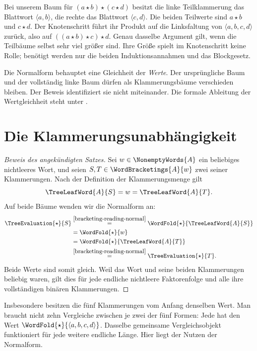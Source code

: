 \BracketingNormalFormDiagram

Bei unserem Baum für \((a\star b)\star(c\star d)\) besitzt die
linke Teilklammerung das Blattwort \(\langle a,b\rangle\), die
rechte das Blattwort \(\langle c,d\rangle\). Die beiden
Teilwerte sind \(a\star b\) und \(c\star d\). Der Knotenschritt
führt ihr Produkt auf die Linksfaltung von
\(\langle a,b,c,d\rangle\) zurück, also auf
\(((a\star b)\star c)\star d\). Genau dasselbe Argument gilt,
wenn die Teilbäume selbst sehr viel größer sind. Ihre Größe spielt
im Knotenschritt keine Rolle; benötigt werden nur die beiden
Induktionsannahmen und das Blockgesetz.

Die Normalform behauptet eine Gleichheit der \emph{Werte}.
Der ursprüngliche Baum und der vollständig linke Baum dürfen als
Klammerungsbäume verschieden bleiben. Der Beweis identifiziert sie
nicht miteinander. Die formale Ableitung der Wertgleichheit steht unter
.

\section*{Die Klammerungsunabhängigkeit}
\hypertarget{bracketing.reading.independence}{}

\begin{proof}[Beweis des angekündigten Satzes]
Sei \(w\in\NonemptyWords{A}\) ein beliebiges nichtleeres Wort,
und seien \(S,T\in\WordBracketings{A}{w}\) zwei seiner
Klammerungen. Nach der Definition der Klammerungsmenge gilt
\[
  \TreeLeafWord{A}{S}=w=\TreeLeafWord{A}{T}.
\]
Auf beide Bäume wenden wir die Normalform an:
\[
  \begin{aligned}
    \TreeEvaluation{\star}{S}
      &\overset{\eqref{bracketing-reading-normal}}{=}
        \WordFold{\star}{\TreeLeafWord{A}{S}}\\
      &=\WordFold{\star}{w}\\
      &=\WordFold{\star}{\TreeLeafWord{A}{T}}\\
      &\overset{\eqref{bracketing-reading-normal}}{=}
        \TreeEvaluation{\star}{T}.
  \end{aligned}
\]
Beide Werte sind somit gleich. Weil das Wort und seine beiden
Klammerungen beliebig waren, gilt dies für jede endliche nichtleere
Faktorenfolge und alle ihre vollständigen binären Klammerungen.
\end{proof}

Insbesondere besitzen die fünf Klammerungen vom Anfang denselben
Wert. Man braucht nicht zehn Vergleiche zwischen je zwei der fünf
Formen: Jede hat den Wert
\(\WordFold{\star}{\langle a,b,c,d\rangle}\).
Dasselbe gemeinsame Vergleichsobjekt funktioniert für jede weitere
endliche Länge. Hier liegt der Nutzen der Normalform.

